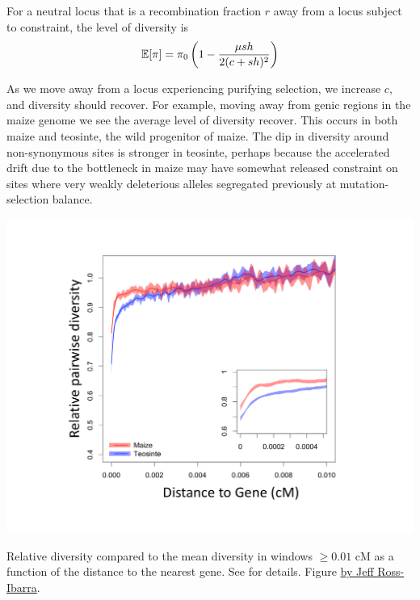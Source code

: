For a neutral locus that is a recombination fraction $r$ away from a
locus subject to constraint, the level of diversity is
\begin{equation}
\mathbb{E}[\pi] = \pi_0  \left(1-\frac{\mu sh}{2(c+sh)^2} \right) \label{eqn:pi_loc_BGS_1}
\end{equation}

As we move away from a locus experiencing purifying selection, 
we increase $c$, and diversity should recover. For example, moving away
from genic regions in the maize genome we see the average level of
diversity recover. This occurs in both maize and teosinte, the wild
progenitor of maize. The dip in diversity around non-synonymous sites is stronger in teosinte, perhaps because the accelerated drift due to the
bottleneck in maize
may have somewhat released constraint on sites where very weakly deleterious
alleles segregated previously at mutation-selection balance. 
\begin{marginfigure}
\begin{center}
\includegraphics[width=\textwidth]{Journal_figs/recom_selection/maize_dist_gene/Figure4_beissinger_A.pdf}
\end{center}
\caption{Relative diversity compared to the mean diversity in windows
  $\ge 0.01$ cM as a function of the distance to the nearest gene.
  See \citep{beissinger2016recent} for details. Figure \PLOSccBY
   \href{https://github.com/RILAB/beissinger_ms}{ by Jeff Ross-Ibarra}.} \label{fig:BGS_maize}
\end{marginfigure}

